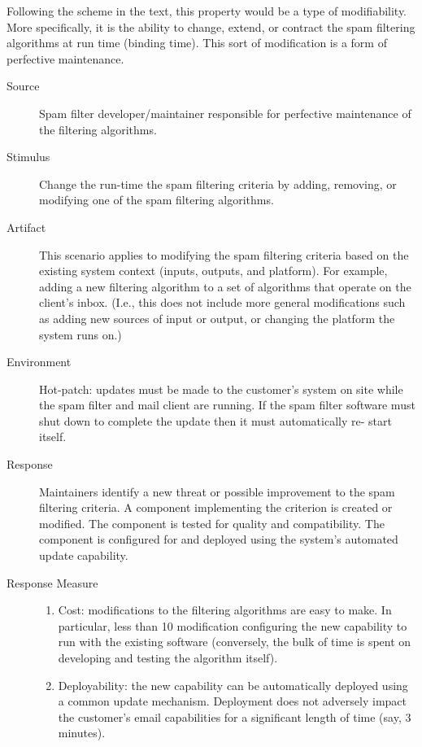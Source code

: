 \documentclass[letterpaper,11pt]{article}
\begin{document}
Following the scheme in the text, this property would be a type of
modifiability. More specifically, it is the ability to change, extend, or
contract the spam filtering algorithms at run time (binding time). This sort
of modification is a form of perfective maintenance.

\begin{description}
\item[Source] Spam filter developer/maintainer responsible for perfective
  maintenance of the filtering algorithms.
\item[Stimulus] Change the run-time the spam filtering criteria by adding,
  removing, or modifying one of the spam filtering algorithms.
\item[Artifact] This scenario applies to modifying the spam filtering criteria
  based on the existing system context (inputs, outputs, and platform). For
  example, adding a new filtering algorithm to a set of algorithms that
  operate on the client’s inbox. (I.e., this does not include more general
  modifications such as adding new sources of input or output, or changing the
  platform the system runs on.)
\item[Environment] Hot-patch: updates must be made to the customer’s system on
  site while the spam filter and mail client are running. If the spam filter
  software must shut down to complete the update then it must automatically
  re- start itself.
\item[Response] Maintainers identify a new threat or possible improvement to
  the spam filtering criteria. A component implementing the criterion is
  created or modified. The component is tested for quality and
  compatibility. The component is configured for and deployed using the
  system’s automated update capability.
\item[Response Measure] \hfill
  \begin{enumerate}
  \item Cost: modifications to the filtering algorithms are easy to make.  In
    particular, less than 10%
    modification configuring the new capability to run with the existing
    software (conversely, the bulk of time is spent on developing and testing
    the algorithm itself).
  \item Deployability: the new capability can be automatically deployed using a
    common update mechanism. Deployment does not adversely impact the customer’s
    email capabilities for a significant length of time (say, 3 minutes).
  \end{enumerate}
\end{description}
 
\end{document}
